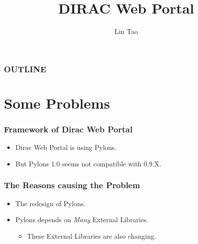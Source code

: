 \documentclass[20pt]{beamer}
\begin{document}
\title{DIRAC Web Portal}
\author{
    \texorpdfstring{Lin Tao 
                    \newline 
                    \href{mailto:lintao@ihep.ac.cn}
                         {\footnotesize{}}}
    {Lin Tao}
}

\maketitle

\begin{frame}
    \frametitle{OUTLINE}
        \tableofcontents
\end{frame}



\section{Some Problems}

\begin{frame}
    \frametitle{Framework of Dirac Web Portal}
    \begin{itemize}    
        \item Dirac Web Portal is using Pylons.
        \item But Pylons 1.0 seems not compatible with 0.9.X.
    \end{itemize}
\end{frame}

\begin{frame}
    \frametitle{The Reasons causing the Problem}
    \begin{itemize}    
        \item The redesign of Pylons.
        \item Pylons depends on \emph{Many} External Libraries.
            \begin{itemize}
                \item These External Libraries are also changing.        
            \end{itemize}
    \end{itemize}
\end{frame}
\end{document}
